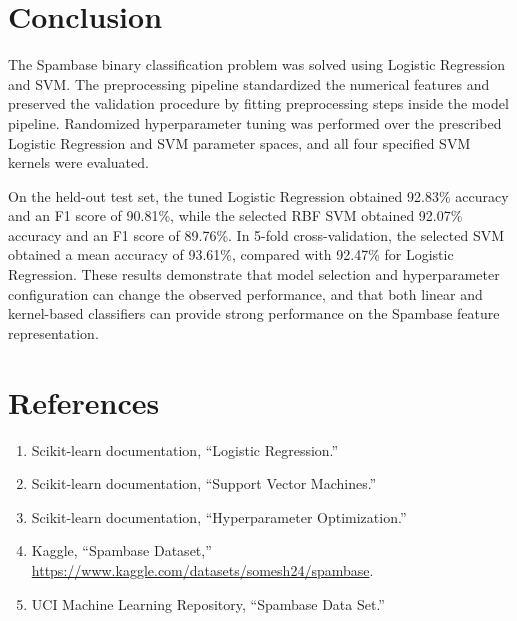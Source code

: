 \documentclass[12pt,a4paper]{article}
\begin{document}
\section{Conclusion}
The Spambase binary classification problem was solved using Logistic Regression and SVM. The preprocessing pipeline standardized the numerical features and preserved the validation procedure by fitting preprocessing steps inside the model pipeline. Randomized hyperparameter tuning was performed over the prescribed Logistic Regression and SVM parameter spaces, and all four specified SVM kernels were evaluated.

On the held-out test set, the tuned Logistic Regression obtained 92.83\% accuracy and an F1 score of 90.81\%, while the selected RBF SVM obtained 92.07\% accuracy and an F1 score of 89.76\%. In 5-fold cross-validation, the selected SVM obtained a mean accuracy of 93.61\%, compared with 92.47\% for Logistic Regression. These results demonstrate that model selection and hyperparameter configuration can change the observed performance, and that both linear and kernel-based classifiers can provide strong performance on the Spambase feature representation.

\section{References}
\begin{enumerate}
    \item Scikit-learn documentation, ``Logistic Regression.''
    \item Scikit-learn documentation, ``Support Vector Machines.''
    \item Scikit-learn documentation, ``Hyperparameter Optimization.''
    \item Kaggle, ``Spambase Dataset,'' \url{https://www.kaggle.com/datasets/somesh24/spambase}.
    \item UCI Machine Learning Repository, ``Spambase Data Set.''
\end{enumerate}
\end{document}
